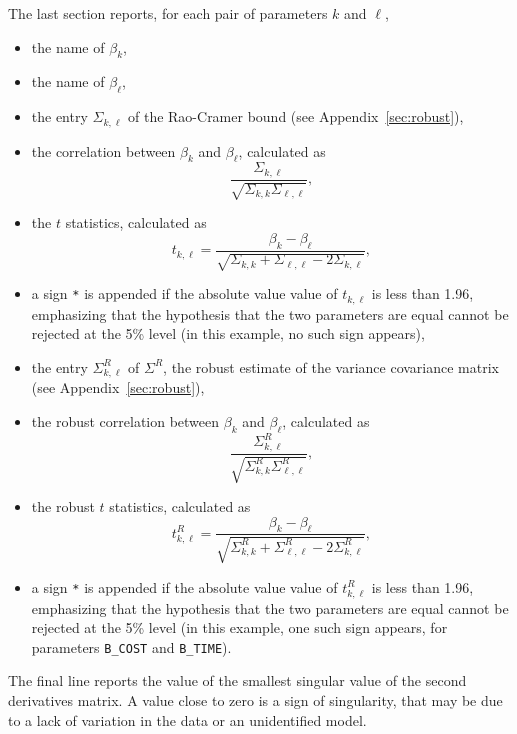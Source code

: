 \documentclass[12pt,a4paper]{article}
\begin{document}
The last section reports, for each pair of parameters $k$ and
$\ell$,
\begin{itemize}
\item the name of $\beta_k$,
\item the name of $\beta_\ell$,
\item the entry $\Sigma_{k,\ell}$ of the 
         Rao-Cramer bound (see Appendix~\ref{sec:robust}),
\item the correlation between $\beta_k$ and $\beta_\ell$, calculated as
\begin{equation}
\frac{\Sigma_{k,\ell}}{\sqrt{\Sigma_{k,k}\Sigma_{\ell,\ell}}},
\end{equation}
\item the $t$ statistics, calculated as
\begin{equation}
t_{k,\ell}= \frac{\beta_k - \beta_\ell}{\sqrt{\Sigma_{k,k} + \Sigma_{\ell,\ell} - 2 \Sigma_{k,\ell}}},
\end{equation}
  \item  a sign \lstinline$*$ is
         appended if the absolute value value of $t_{k,\ell}$ is less than
         1.96, emphasizing that the hypothesis that the two parameters
         are equal cannot be rejected at the 5\% level (in this example, no such sign appears), 
\item the entry $\Sigma^R_{k,\ell}$ of $\Sigma^R$, the robust estimate of the variance covariance matrix (see Appendix~\ref{sec:robust}),
\item the robust correlation between $\beta_k$ and $\beta_\ell$, calculated as
\begin{equation}
\frac{\Sigma^R_{k,\ell}}{\sqrt{\Sigma^R_{k,k}\Sigma^R_{\ell,\ell}}},
\end{equation}
\item the robust $t$ statistics, calculated as
\begin{equation}
t^R_{k,\ell}=\frac{\beta_k - \beta_\ell}{\sqrt{\Sigma^R_{k,k} + \Sigma^R_{\ell,\ell}
    - 2 \Sigma^R_{k,\ell}}},
\end{equation}
  \item  a sign \lstinline$*$ is
         appended if the absolute value value of $t^R_{k,\ell}$ is less than
         1.96, emphasizing that the hypothesis that the two parameters
         are equal cannot be rejected at the 5\% level (in this
         example, one such sign appears, for parameters
         \lstinline$B_COST$ and \lstinline$B_TIME$). 
\end{itemize}
The final line reports the value of the smallest singular value of the
second derivatives matrix. A value close to zero is a sign of
singularity, that may be due to a lack of variation in the data or
an unidentified model.
\end{document}
